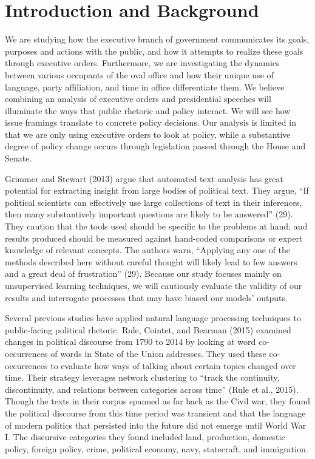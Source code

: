 \documentclass{article}
\begin{document}
\newpage
\section{Introduction and Background}{
We are studying how the executive branch of government communicates its goals, purposes and actions with the public, and how it attempts to realize these goals through executive orders. Furthermore, we are investigating the dynamics between various occupants of the oval office and how their unique use of language, party affiliation, and time in office differentiate them. We believe combining an analysis of executive orders and presidential speeches will illuminate the ways that public rhetoric and policy interact. We will see how issue framings translate to concrete policy decisions. Our analysis is limited in that we are only using executive orders to look at policy, while a substantive degree of policy change occurs through legislation passed through the House and Senate.

Grimmer and Stewart (2013) argue that automated text analysis has great potential for extracting insight from large bodies of political text. They argue, “If political scientists can effectively use large collections of text in their inferences, then many substantively important questions are likely to be answered” (29). They caution that the tools used should be specific to the problems at hand, and results produced should be measured against hand-coded comparisons or expert knowledge of relevant concepts. The authors warn, “Applying any one of the methods described here without careful thought will likely lead to few answers and a great deal of frustration” (29). Because our study focuses mainly on unsupervised learning techniques, we will cautiously evaluate the validity of our results and interrogate processes that may have biased our models’ outputs. 

Several previous studies have applied natural language processing techniques to public-facing political rhetoric. Rule, Cointet, and Bearman (2015) examined changes in political discourse from 1790 to 2014 by looking at word co-occurrences of words in State of the Union addresses. They used these co-occurrences to evaluate how ways of talking about certain topics changed over time. Their strategy leverages network clustering to “track the continuity, discontinuity, and relations between categories across time” (Rule et al., 2015). Though the texts in their corpus spanned as far back as the Civil war, they found the political discourse from this time period was transient and that the language of modern politics that persisted into the future did not emerge until World War I. The discursive categories they found included land, production, domestic policy, foreign policy, crime, political economy, navy, statecraft, and immigration.

}
\end{document}
